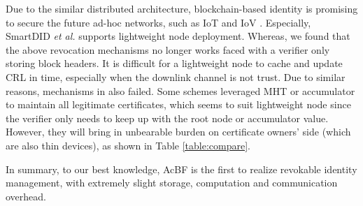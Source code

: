 \documentclass[conference]{IEEEtran}
\begin{document}
Due to the similar distributed architecture, blockchain-based identity is promising to secure the future ad-hoc networks, such as IoT and IoV \cite{cui2022efficient, singh2018branch, smartdid, yu2019blockchain}. Especially, SmartDID \textit{et al.} \cite{smartdid} supports lightweight node deployment.%
Whereas, we found that the above revocation mechanisms no longer works faced with a verifier only storing block headers. It is difficult for a lightweight node to cache and update CRL in time, especially when the downlink channel is not trust. Due to similar reasons, mechanisms in \cite{luoScalaCertScalabilityOrientedPKI2022a, jiaRedactableBlockchainDecentralized2022} also failed. Some schemes leveraged MHT \cite{certledger} or accumulator \cite{yu2019blockchain} to maintain all legitimate certificates, which seems to suit lightweight node since the verifier only needs to keep up with the root node or accumulator value. 
However, they will bring in unbearable burden on certificate owners' side (which are also thin devices), as shown in Table \ref{table:compare}. 

In summary, to our best knowledge, AcBF is the first to realize revokable identity management, with extremely slight storage, computation and communication overhead. %

\end{document}
